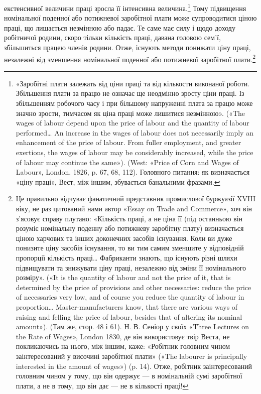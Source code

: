 \parcont{}  %
екстенсивної величини праці зросла її інтенсивна величина.\footnote{
«Заробітні плати залежать від ціни праці та від кількости виконаної
роботи. Збільшення плати за працю не означає ще неодмінно зросту
ціни праці. Із збільшенням робочого часу і при більшому напруженні
плата за працю може значно зрости, тимчасом як ціна праці може лишитися
незмінною». («The wages of labour depend upon the price of labour
and the quantity of labour performed\dots{} An increase in the wages of
labour does not necessarily imply an enhancement of the price of labour.
From fuller employment, and greater exertions, the wages of labour may
be considerably increased, while the price of labour may continue the same»).
(West: «Price of Corn and Wages of Labour», London. 1826, p. 67, 68, 112).
Головного питання: як визначається «ціну праці», Вест, між іншим,
збувається банальними фразами.
}
Тому підвищення номінальної поденної або потижневої заробітної
плати може супроводитися ціною праці, що лишається
незмінною або падає. Те саме має силу і щодо доходу робітничої
родини, скоро тільки кількість праці, давана головою сем’ї,
збільшиться працею членів родини. Отже, існують методи понижати
ціну праці, незалежні від зменшення номінальної поденної
або потижневої заробітної плати.\footnote{
Це правильно відчуває фанатичний представник промислової
буржуазії XVIII віку, не раз цитований нами автор «Essay on Trade
and Commerce», хоч він з’ясовує справу плутано: «Кількість праці,
а не ціна її (під останньою він розуміє номінальну поденну або потижневу
заробітну плату) визначається ціною харчових та інших доконечних засобів
існування. Коли ви дуже понизите ціну засобів існування, то ви
тим самим зменшите у відповідній пропорції кількість праці\dots{} Фабриканти
знають, що існують різні шляхи підвищувати та знижувати ціну
праці, незалежно від зміни її номінального розміру». («It is the quantity
of labour and not the price of it, that is determined by the price of provisions
and other necessaries: reduce the price of necessaries very low, and
of course you reduce the quantity of labour in proportion\dots{} Master-manufacturers
know, that there are various ways of raising and felling the
price of labour, besides that of altering its nominal amount»). (Там же,
стор. 48 і 61). Н. В. Сеніор у своїх «Three Lectures on the Rate of Wages»,
London 1830, де він використовує твір Веста, не покликаючись на
нього, між іншим, каже: «Робітник головним чином заінтересований
у височині заробітної плати» («The labourer is principally interested
in the amount of wages») (p. 14). Отже, робітник заінтересований головним
чином у тому, що він одержує — в номінальній сумі заробітної плати,
а не в тому, що він дає — не в кількості праці!
}

